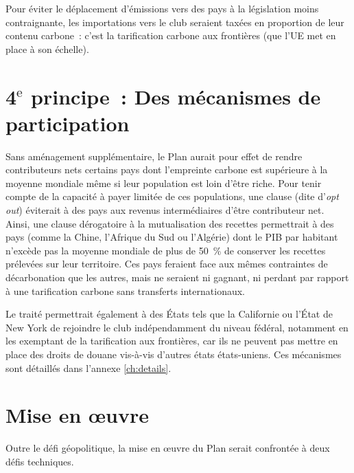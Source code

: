 \documentclass[a5paper,french,openany]{memoir}
\begin{document}

Pour éviter le déplacement d'émissions vers des pays à la législation moins contraignante, les importations vers le club seraient taxées en proportion de leur contenu carbone~: c'est la tarification carbone aux frontières (que l'UE met en place à son échelle). 

\section{4$^\text{e}$ principe~: Des mécanismes de participation}

Sans aménagement supplémentaire, le Plan aurait pour effet de rendre contributeurs nets certains pays dont l'empreinte carbone est supérieure à la moyenne mondiale même si leur population est loin d'être riche. Pour tenir compte de la capacité à payer limitée de ces populations, une clause (dite d'\textit{opt out}) éviterait à des pays aux revenus intermédiaires d'être contributeur net. Ainsi, une clause dérogatoire à la mutualisation des recettes permettrait à des pays (comme la Chine, l'Afrique du Sud ou l'Algérie) dont le PIB par habitant n'excède pas la moyenne mondiale de plus de 50~\% de conserver les recettes prélevées sur leur territoire. Ces pays feraient face aux mêmes contraintes de décarbonation que les autres, mais ne seraient ni gagnant, ni perdant par rapport à une tarification carbone sans transferts internationaux. 

Le traité permettrait également à des États tels que la Californie ou l'État de New York de rejoindre le club indépendamment du niveau fédéral, notamment en les exemptant de la tarification aux frontières, car ils ne peuvent pas mettre en place des droits de douane vis-à-vis d'autres états états-uniens. 
Ces mécanismes sont détaillés dans l'annexe \ref{ch:details}. 


\section{Mise en œuvre}\label{sec:implementation}
Outre le défi géopolitique, la mise en œuvre du Plan serait confrontée à deux défis techniques. 
\end{document}
